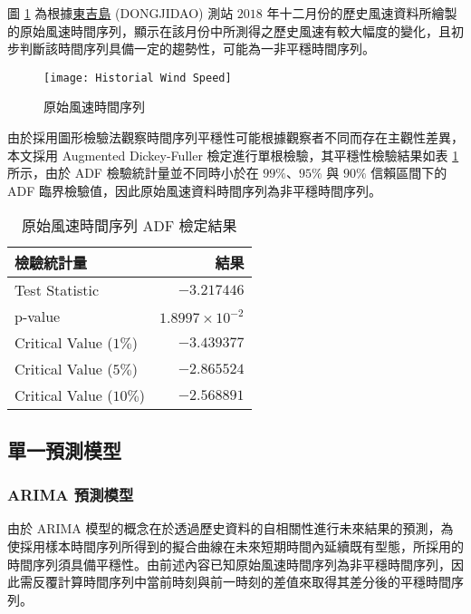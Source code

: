 圖 \ref{figure: Historial Wind Speed} 為根據\uline{東吉島} (DONGJIDAO) 測站 $2018$ 年十二月份的歷史風速資料所繪製的原始風速時間序列，顯示在該月份中所測得之歷史風速有較大幅度的變化，且初步判斷該時間序列具備一定的趨勢性，可能為一非平穩時間序列。

\begin{figure}[htbp]
  \centering
  \texttt{[image: Historial Wind Speed]}
  \caption{原始風速時間序列}
  \label{figure: Historial Wind Speed}
\end{figure}

由於採用圖形檢驗法觀察時間序列平穩性可能根據觀察者不同而存在主觀性差異，本文採用 Augmented Dickey-Fuller 檢定進行單根檢驗，其平穩性檢驗結果如表 \ref{table: Raw Time Series ADF Result} 所示，由於 ADF 檢驗統計量並不同時小於在 $99\%$、$95\%$ 與 $90\%$ 信賴區間下的 ADF 臨界檢驗值，因此原始風速資料時間序列為非平穩時間序列。

\begin{table}[htbp]
  \centering
  \caption[原始風速時間序列 ADF 檢定結果]{原始風速時間序列 ADF 檢定結果}
  \begin{tabular}{lr}
    \toprule
    \textbf{檢驗統計量}     & \textbf{結果} \\
    \midrule
    Test Statistic          & $-3.217446$ \\
    p-value                 & $1.8997 \times 10^{-2}$ \\
    Critical Value ($1\%$)  & $-3.439377$ \\
    Critical Value ($5\%$)  & $-2.865524$ \\
    Critical Value ($10\%$) & $-2.568891$ \\
    \bottomrule
  \end{tabular}
  \label{table: Raw Time Series ADF Result}
\end{table}

\subsection{單一預測模型}

\subsubsection{ARIMA 預測模型}

由於 ARIMA 模型的概念在於透過歷史資料的自相關性進行未來結果的預測，為使採用樣本時間序列所得到的擬合曲線在未來短期時間內延續既有型態，所採用的時間序列須具備平穩性。由前述內容已知原始風速時間序列為非平穩時間序列，因此需反覆計算時間序列中當前時刻與前一時刻的差值來取得其差分後的平穩時間序列。

